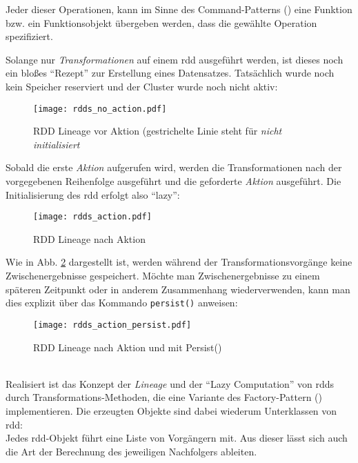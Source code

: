 Jeder dieser Operationen, kann im Sinne des Command-Patterns (\cite{FPP13}) eine Funktion bzw. ein Funktionsobjekt übergeben werden, dass die gewählte Operation spezifiziert.

Solange nur \textit{Transformationen} auf einem \gls{rdd} ausgeführt werden, ist dieses noch ein bloßes "`Rezept"' zur Erstellung eines Datensatzes. Tatsächlich wurde noch kein Speicher reserviert und der Cluster wurde noch nicht aktiv\cite{Mat12}:\\

\begin{figure}[ht!]
	\centering
  \texttt{[image: rdds\_no\_action.pdf]}
	\caption{RDD Lineage vor Aktion (gestrichelte Linie steht für \textit{nicht initialisiert}}
	\label{fig:rdds_no_action}
\end{figure}

Sobald die erste \textit{Aktion} aufgerufen wird, werden die Transformationen nach der vorgegebenen Reihenfolge ausgeführt und die geforderte \textit{Aktion} ausgeführt. Die Initialisierung des \gls{rdd} erfolgt also "`lazy"':\\

\begin{figure}[ht!]
	\centering
  \texttt{[image: rdds\_action.pdf]}
	\caption{RDD Lineage nach Aktion}
	\label{fig:rdds_action}
\end{figure}

Wie in Abb. \ref{fig:rdds_action} dargestellt ist, werden während der Transformationsvorgänge keine Zwischenergebnisse gespeichert. Möchte man Zwischenergebnisse zu einem späteren Zeitpunkt oder in anderem Zusammenhang wiederverwenden, kann man dies explizit über das Kommando \lstinline|persist()| anweisen:\\

\begin{figure}[ht!]
	\centering
  \texttt{[image: rdds\_action\_persist.pdf]}
	\caption{RDD Lineage nach Aktion und mit Persist()}
	\label{fig:rdds_action_persist}
\end{figure}
\\
Realisiert ist das Konzept der \textit{Lineage} und der "`Lazy Computation"' von \glspl{rdd} durch Transformations-Methoden, die eine Variante des Factory-Pattern (\cite{FPP13}) implementieren. Die erzeugten Objekte sind dabei wiederum Unterklassen von \gls{rdd}:\\
Jedes \gls{rdd}-Objekt führt eine Liste von Vorgängern mit. Aus dieser lässt sich auch die Art der Berechnung des jeweiligen Nachfolgers ableiten.\\

